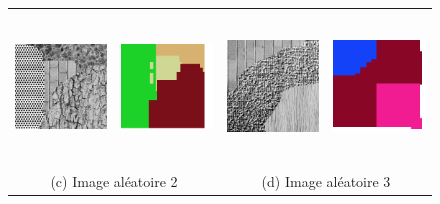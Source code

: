 \begin{figure}
\begin{tabular}{cccc}
\includegraphics[width=4cm, height=4cm]{Figures/chap3/first.png}
&
\includegraphics[width=4cm, height=4cm]{Figures/chap3/first2.png}
&
\includegraphics[width=4cm, height=4cm]{Figures/chap3/second.png}
&
\includegraphics[width=4cm, height=4cm]{Figures/chap3/second2.png}\\

\multicolumn{2}{c}{(c) Image aléatoire 2}
&
\multicolumn{2}{c}{(d) Image aléatoire 3}\\



\end{tabular}
\end{figure}
